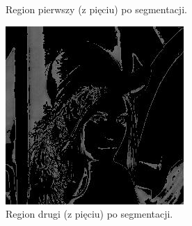\documentclass[10pt]{llncs}
\begin{document}
\begin{figure}[!htb]
  \caption{Region pierwszy (z pięciu) po segmentacji.}\label{fig:5}
\endminipage\hfill
{}
  \includegraphics[width=\linewidth]{img/02_region_02.jpg}
  \caption{Region drugi (z pięciu) po segmentacji.}\label{fig:6}
\endminipage
\end{figure}
\end{document}
